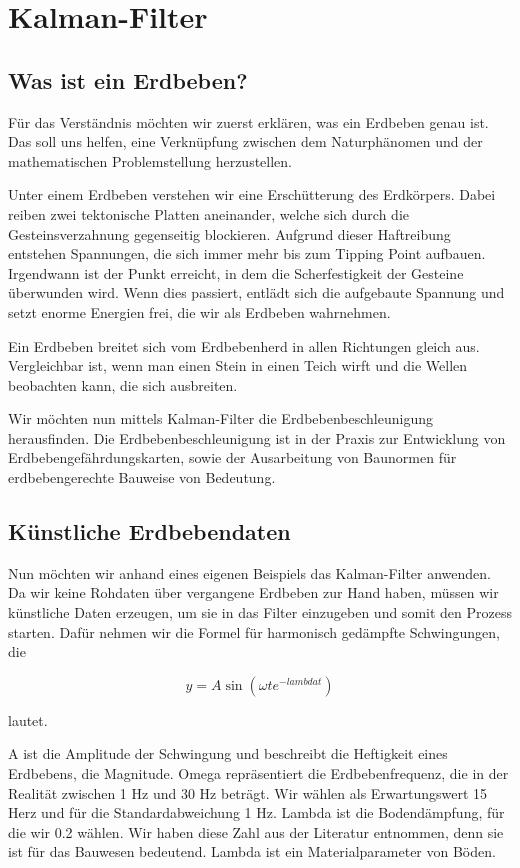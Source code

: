 \section{Kalman-Filter}
\subsection{Was ist ein Erdbeben?}
Für das Verständnis möchten wir zuerst erklären, was ein Erdbeben genau ist.
Das soll uns helfen, eine Verknüpfung zwischen dem Naturphänomen und der mathematischen Problemstellung herzustellen.


Unter einem Erdbeben verstehen wir eine Erschütterung des Erdkörpers.
Dabei reiben zwei tektonische Platten aneinander, welche sich durch die Gesteinsverzahnung gegenseitig blockieren.
Aufgrund dieser Haftreibung entstehen Spannungen, die sich immer mehr bis zum Tipping Point aufbauen.
Irgendwann ist der Punkt erreicht, in dem die Scherfestigkeit der Gesteine überwunden wird.
Wenn dies passiert, entlädt sich die aufgebaute Spannung und setzt enorme Energien frei, die wir als Erdbeben wahrnehmen.

Ein Erdbeben breitet sich vom Erdbebenherd in allen Richtungen gleich aus.
Vergleichbar ist, wenn man einen Stein in einen Teich wirft und die Wellen beobachten kann, die sich ausbreiten.

Wir möchten nun mittels Kalman-Filter die Erdbebenbeschleunigung herausfinden.
Die Erdbebenbeschleunigung ist in der Praxis zur Entwicklung von Erdbebengefährdungskarten, sowie der Ausarbeitung von Baunormen für erdbebengerechte Bauweise von Bedeutung.


\subsection{Künstliche Erdbebendaten}
Nun möchten wir anhand eines eigenen Beispiels das Kalman-Filter anwenden.
Da wir keine Rohdaten über vergangene Erdbeben zur Hand haben, müssen wir künstliche Daten erzeugen, um sie in das Filter einzugeben und somit den Prozess starten.
Dafür nehmen wir die Formel für harmonisch gedämpfte Schwingungen, die

\begin{equation}
	y = A \sin(\omega t e^{-lambda t})
\end{equation} 

lautet. 

A ist die Amplitude der Schwingung und beschreibt die Heftigkeit eines Erdbebens, die Magnitude.
Omega repräsentiert die Erdbebenfrequenz, die in der Realität zwischen 1 Hz und 30 Hz beträgt.
Wir wählen als Erwartungswert 15 Herz und für die Standardabweichung 1 Hz.
Lambda ist die Bodendämpfung, für die wir 0.2 wählen.
Wir haben diese Zahl aus der Literatur entnommen, denn sie ist für das Bauwesen bedeutend.
Lambda ist ein Materialparameter von Böden.

